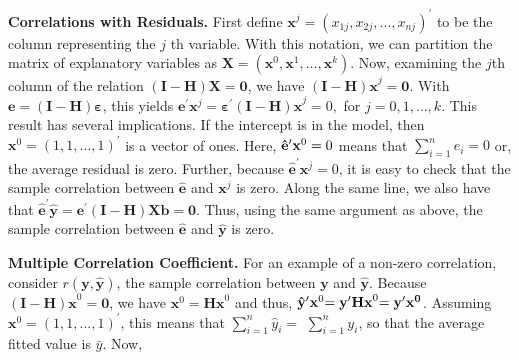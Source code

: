 \textbf{Correlations with Residuals.} First define $\mathbf{x}%
^{j}=(x_{1j},x_{2j},\dots,x_{nj})^{\prime}$ to be the column representing the $j$%
th variable. With this notation, we can partition the matrix of
explanatory
variables as $\mathbf{X}=\left( \mathbf{x}^{0},\mathbf{x}^{1},\dots,\mathbf{x}^{k}%
\right)$. Now, examining the $j$th column of the relation $\mathbf{(I-H)X}=%
\mathbf{0}$, we have $\mathbf{(I-H)x}^{j}=\mathbf{0}$. With $%
\mathbf{e}=\mathbf{(I-H) \boldsymbol \varepsilon}$, this yields $
\mathbf{e}^{\prime}\mathbf{x}^{j}=\boldsymbol \varepsilon^{\prime}\mathbf{(I-H)x}%
^{j}=0,$ for $j=0,1,\ldots,k.$ This result has several implications.
If the intercept is in the model, then
$\mathbf{x}^{0}=(1,1,\ldots,1)^{\prime}$ is a vector of ones. Here, $\mathbf{\hat{%
e}}^{\prime}\mathbf{x}^{0}=0$ means that $\sum_{i=1}^{n}\hat{e}_i=0$
or,
the average residual is zero. Further, because $\mathbf{\hat{e}}^{\prime}%
\mathbf{x}^{j}=0$, it is easy to check that the sample correlation between $%
\mathbf{\hat{e}}$ and $\mathbf{x}^{j}$ is zero. Along the same line,
we also
have that $\mathbf{\hat{e}}^{\prime}\mathbf{\hat{y}}=\mathbf{e}^{\prime}%
\mathbf{(I-H)Xb}=\mathbf{0}$. Thus, using the same argument as
above, the sample correlation between $\mathbf{\hat{e}}$ and
$\mathbf{\hat{y}}$ is zero.


\textbf{Multiple Correlation Coefficient.} For an example of a
non-zero correlation, consider $r(\mathbf{y,\hat{y}})$, the sample
correlation
between $\mathbf{y}$ and $\mathbf{\hat{y}}$. Because $\mathbf{(I-H)x}^{0}=%
\mathbf{0}$, we have $\mathbf{x}^{0}=\mathbf{Hx}^{0}$ and thus, $\mathbf{%
\hat{y}}^{\prime}\mathbf{x}^{0}\mathbf{=y}^{\prime}\mathbf{Hx}^{0}\mathbf{%
=y^{\prime} x^{0}}$. Assuming
$\mathbf{x}^{0}=(1,1,\ldots,1)^{\prime}$, this means that
$\sum_{i=1}^{n}\hat{y}_i=$ $\sum_{i=1}^{n}y_i$, so that the average
fitted value is $\bar{y}$. Now,


